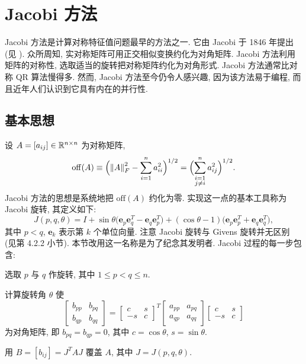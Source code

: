 \section{Jacobi 方法}
\label{sec:8-3}

Jacobi 方法是计算对称特征值问题最早的方法之一. 它由 Jacobi 于 1846 年提出 (见 \cite{src:32}). 众所周知, 实对称矩阵可用正交相似变换约化为对角矩阵. Jacobi 方法利用矩阵的对称性, 选取适当的旋转把对称矩阵约化为对角形式. Jacobi 方法通常比对称 QR 算法慢得多. 然而, Jacobi 方法至今仍令人感兴趣, 因为该方法易于编程, 而且近年人们认识到它具有内在的并行性.

\subsection{基本思想}
\label{sec:8-3-1}

设 $A=[a_{ij}]\in\mathbb{R}^{n\times n}$ 为对称矩阵,
\[
  \mathrm{off}(A)\equiv\Bigl(\left\|A\right\|_F^2-\sum_{i=1}^{n}a_{ii}^2\Bigr)^{1/2}
  =\Bigl(\sum_{\substack{i=1\\ j\neq i}}^{n}a_{ij}^2\Bigr)^{1/2}.
\]
Jacobi 方法的思想是系统地把 $\mathrm{off}(A)$ 约化为零. 实现这一点的基本工具称为 Jacobi 旋转, 其定义如下:
\[
  J(p,q,\theta)=I+\sin\theta\bigl(\mathbf{e}_p\mathbf{e}_q^T-\mathbf{e}_q\mathbf{e}_p^T\bigr)
  +(\cos\theta-1)\bigl(\mathbf{e}_p\mathbf{e}_p^T+\mathbf{e}_q\mathbf{e}_q^T\bigr),
\]
其中 $p<q$, $\mathbf{e}_k$ 表示第 $k$ 个单位向量. 注意 Jacobi 旋转与 Givens 旋转并无区别 (见第 4.2.2 小节). 本节改用这一名称是为了纪念其发明者. Jacobi 过程的每一步包含:
\begin{parenlist}
  \item 选取 $p$ 与 $q$ 作旋转, 其中 $1\leqslant p<q\leqslant n$.
  \item 计算旋转角 $\theta$ 使
    \begin{equation}
      \begin{bmatrix}
        b_{pp} & b_{pq}\\
        b_{qp} & b_{qq}
      \end{bmatrix}
      =\begin{bmatrix}
        c & s\\
        -s & c
      \end{bmatrix}^T
      \begin{bmatrix}
        a_{pp} & a_{pq}\\
        a_{qp} & a_{qq}
      \end{bmatrix}
      \begin{bmatrix}
        c & s\\
        -s & c
      \end{bmatrix}
      \label{eq:8-2}
    \end{equation}
    为对角矩阵, 即 $b_{pq}=b_{qp}=0$, 其中 $c=\cos\theta$, $s=\sin\theta$.
  \item 用 $B=[b_{ij}]=J^TAJ$ 覆盖 $A$, 其中 $J=J(p,q,\theta)$.
\end{parenlist}

